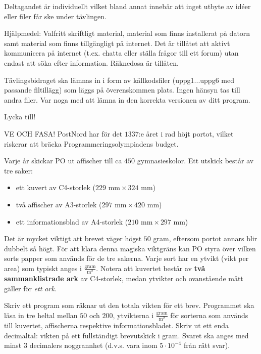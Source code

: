 \begin{lista}
\item Deltagandet är individuellt vilket bland annat innebär att inget utbyte av idéer eller 
filer får ske under tävlingen.  
\item Hjälpmedel: Valfritt skriftligt material, material som finns installerat på datorn samt material som finns tillgängligt på internet. Det är  tillåtet att aktivt kommunicera på internet (t.ex. chatta eller ställa frågor till ett forum) utan endast att söka efter information. Räknedosa är tillåten.
\item Tävlingsbidraget ska lämnas in i form av källkodsfiler (uppg1...uppg6 med passande filtillägg) som läggs på överenskommen plats. Ingen hänsyn tas till andra filer. Var noga 
med att lämna in den korrekta versionen av ditt program.  
\end{lista}

\begin{center}
\Large Lycka till!
\end{center}
%

\newpage
{}

VE OCH FASA!
PostNord har för det $1337$:e året i rad höjt portot, vilket riskerar att bräcka Programmeringsolympiadens budget.

Varje år skickar PO ut affischer till ca $450$ gymnasieskolor. Ett utskick består av tre saker: 
\begin{itemize}
\item ett kuvert av C4-storlek ($229\text{ mm} \times 324\text{ mm}$)
\item två affischer av A3-storlek ($297\text{ mm} \times 420\text{ mm}$)
\item ett informationsblad av A4-storlek ($210\text{ mm} \times 297\text{ mm}$)
\end{itemize}

Det är mycket viktigt att brevet väger högst $50$ gram, eftersom portot annars blir dubbelt så högt. För att klara denna magiska viktgräns kan PO styra över vilken sorts papper som används för de tre sakerna. Varje sort har en ytvikt (vikt per area) som typiskt anges i $\frac{\text{gram}}{\text{m}^2}$. Notera att kuvertet består av \textbf{två sammanklistrade ark} av C4-storlek, medan ytvikter och ovanstående mått gäller för \emph{ett ark}.

Skriv ett program som räknar ut den totala vikten för ett brev. Programmet ska läsa in tre heltal mellan $50$ och $200$, ytvikterna i $\frac{\text{gram}}{\text{m}^2}$ för sorterna som används till kuvertet, affischerna respektive informationsbladet. Skriv ut ett enda decimaltal: vikten på ett fullständigt brevutskick i gram. Svaret ska anges med minst $3$ decimalers noggrannhet (d.v.s. vara inom $5 \cdot 10^{-4}$ från rätt svar).

